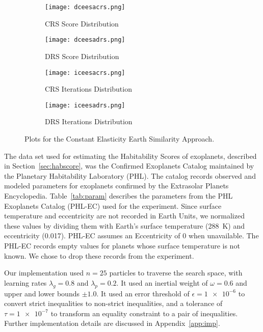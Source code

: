 \documentclass[10pt,draft]{article}
\begin{document}
\begin{figure}
  \centering
  \begin{subfigure}[b]{0.38\textwidth}
    \texttt{[image: dceesacrs.png]}
    \caption{CRS Score Distribution}\label{fig:distcecrs}
  \end{subfigure}
  \quad
  \begin{subfigure}[b]{0.38\textwidth}
    \texttt{[image: dceesadrs.png]}
    \caption{DRS Score Distribution}\label{fig:distcedrs}
  \end{subfigure}

  \begin{subfigure}[b]{0.38\textwidth}
    \texttt{[image: iceesacrs.png]}
    \caption{CRS Iterations Distribution}\label{fig:itercecrs}
  \end{subfigure}
  \quad
  \begin{subfigure}[b]{0.38\textwidth}
    \texttt{[image: iceesadrs.png]}
    \caption{DRS Iterations Distribution}\label{fig:itercedrs}
  \end{subfigure}
  \caption{Plots for the Constant Elasticity Earth Similarity Approach.}\label{fig:ceesa}
\end{figure}


The data set used for estimating the Habitability Scores of exoplanets, described in Section~\ref{sec:habscore}, was the
Confirmed Exoplanets Catalog maintained by the Planetary Habitability Laboratory (PHL). The catalog records observed and
modeled parameters for exoplanets confirmed by the Extrasolar Planets Encyclopedia. Table~\ref{tab:param} describes the
parameters from the PHL Exoplanets Catalog (PHL-EC) used for the experiment. Since surface temperature and eccentricity
are not recorded in Earth Units, we normalized these values by dividing them with Earth's surface temperature
(\SI{288}{\kelvin}) and eccentricity (\num{0.017}). PHL-EC assumes an Eccentricity of 0 when unavailable. The PHL-EC
records empty values for planets whose surface temperature is not known. We chose to drop these records from the
experiment.

Our implementation used $n=25$ particles to traverse the search space, with learning rates $\lambda_g=0.8$ and
$\lambda_p=0.2$. It used an inertial weight of $\omega=0.6$ and upper and lower bounds $\pm1.0$. It used an error
threshold of $\epsilon=\num{1e-6}$ to convert strict inequalities to non-strict inequalities, and a tolerance of
$\tau=\num{1e-7}$ to transform an equality constraint to a pair of inequalities. Further implementation details are
discussed in Appendix~\ref{app:imp}.
\end{document}
